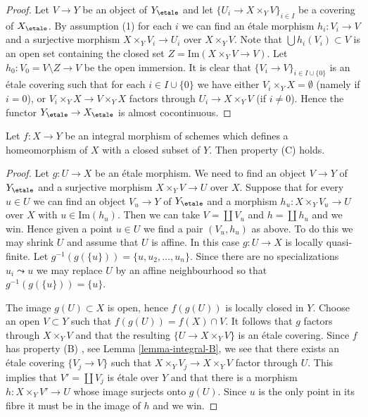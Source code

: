 \begin{proof}
Let $V \to Y$ be an object of $Y_\etale$ and let
$\{U_i \to X \times_Y V\}_{i \in I}$ be a covering of $X_\etale$.
By assumption (1) for each $i$ we can find an \'etale morphism
$h_i : V_i \to V$ and a surjective morphism $X \times_Y V_i \to U_i$
over $X \times_Y V$. Note that $\bigcup h_i(V_i) \subset V$ is an
open set containing the closed set $Z = \text{Im}(X \times_Y V \to V)$.
Let $h_0 : V_0 = V \setminus Z \to V$ be the open immersion.
It is clear that $\{V_i \to V\}_{i \in I \cup \{0\}}$ is an
\'etale covering such that for each $i \in I \cup \{0\}$ we have
either $V_i \times_Y X = \emptyset$ (namely if $i = 0$), or
$V_i \times_Y X \to V \times_Y X$ factors through $U_i \to X \times_Y V$
(if $i \not = 0$). Hence the functor $Y_\etale \to X_\etale$
is almost cocontinuous.
\end{proof}

\begin{lemma}
\label{lemma-integral-homeo-onto-image-C}
Let $f : X \to Y$ be an integral morphism of schemes which defines
a homeomorphism of $X$ with a closed subset of $Y$.
Then property (C) holds.
\end{lemma}

\begin{proof}
Let $g : U \to X$ be an \'etale morphism. We need to find an object
$V \to Y$ of $Y_\etale$ and a surjective morphism $X \times_Y V \to U$
over $X$. Suppose that for every $u \in U$ we can find an object
$V_u \to Y$ of $Y_\etale$ and a morphism $h_u : X \times_Y V_u \to U$
over $X$ with $u \in \text{Im}(h_u)$. Then we can take $V = \coprod V_u$
and $h = \coprod h_u$ and we win. Hence given a point
$u \in U$ we find a pair $(V_u, h_u)$ as above. To do this we may
shrink $U$ and assume that $U$ is affine. In this case
$g : U \to X$ is locally quasi-finite. Let
$g^{-1}(g(\{u\})) = \{u, u_2, \ldots, u_n\}$. Since there are no
specializations $u_i \leadsto u$ we may replace $U$ by an affine neighbourhood
so that $g^{-1}(g(\{u\})) = \{u\}$.

\medskip\noindent
The image $g(U) \subset X$ is open,
hence $f(g(U))$ is locally closed in $Y$. Choose an open $V \subset Y$ such
that $f(g(U)) = f(X) \cap V$. It follows that $g$ factors through
$X \times_Y V$ and that the resulting $\{U \to X \times_Y V\}$ is an \'etale
covering. Since $f$ has property (B) , see
Lemma \ref{lemma-integral-B},
we see that there exists an \'etale covering $\{V_j \to V\}$ such that
$X \times_Y V_j \to X \times_Y V$ factor through $U$.
This implies that $V' = \coprod V_j$ is \'etale over $Y$ and that there is a
morphism $h : X \times_Y V' \to U$ whose image
surjects onto $g(U)$. Since $u$ is the only point in its fibre it must
be in the image of $h$ and we win.
\end{proof}

